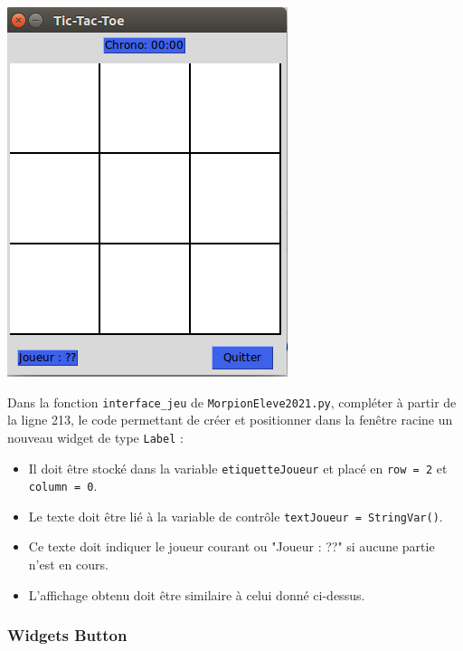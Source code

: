 \documentclass[a4paper, french, 12pt]{article}  %
\newcounter{exo}
\newcounter{exoB}
\newenvironment{exerciceB2}
{\par \bigskip  \noindent \addtocounter{exoB}{1} \hrulefill \quad { \large \textbf{Exercice \theexoB}} \quad \hrulefill \par \medskip }
{\par \bigskip }
\begin{document}
\begin{exerciceB2}{}
 

\begin{center}
	\includegraphics[scale=0.6]{graphiques/morpion-labels.png}
\end{center}	 



Dans la fonction \lstinline+interface_jeu+ de \texttt{MorpionEleve2021.py}, compléter à partir de la ligne 213, le code permettant de créer et positionner dans la fenêtre racine un nouveau  widget de type \lstinline+Label+ :
\begin{itemize}[label=\textbullet]
\item Il doit être stocké dans la variable  \lstinline+etiquetteJoueur+ et placé en \lstinline+row = 2+ et \lstinline+column = 0+.
\item Le texte doit être lié à la variable de contrôle \lstinline+textJoueur = StringVar()+.
\item Ce texte doit indiquer le joueur courant ou "Joueur : ??" si aucune partie n'est en cours. 
\item L'affichage obtenu doit être similaire à celui donné ci-dessus.
\end{itemize}

\end{exerciceB2}

\subsubsection{Widgets Button}
\end{document}
